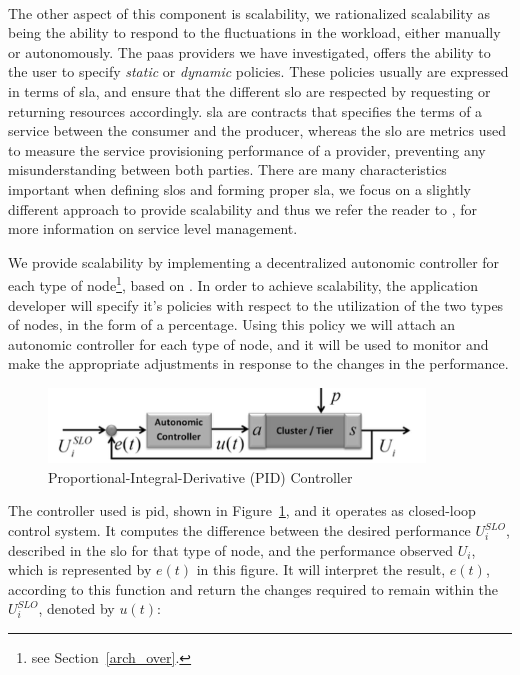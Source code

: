\documentclass[12pt, titlepage]{uo_temp}
\begin{document}

     \\ The other aspect of this component is scalability, we rationalized scalability as
     being the ability to respond to the fluctuations in the workload, either manually or
     autonomously.  The \gls{paas} providers we have investigated, offers the ability to
     the user to specify \emph{static} or \emph{dynamic} policies. These policies usually
     are expressed in terms of \gls{sla}, and ensure that the different \gls{slo} are
     respected by requesting or returning resources accordingly. \gls{sla} are contracts
     that specifies the terms of a service between the consumer and the producer, whereas
     the \gls{slo} are metrics used to measure the service provisioning performance of a
     provider, preventing any misunderstanding between both parties. There are many
     characteristics important when defining \gls{slo}s and forming proper \gls{sla}, we
     focus on a slightly different approach to provide scalability and thus we refer the
     reader to \cite{keller2003wsla} \cite{sturm2000foundations}, for more information on
     service level management.

     We provide scalability by implementing a decentralized autonomic
     controller for each type of node\footnote{see Section~\ref{arch_over}.}, based on
     \cite{gergin2014decentralized}. In order to achieve scalability, the application
     developer will specify it's policies with respect to the utilization of the two types
     of nodes, in the form of a percentage. Using this policy we will attach an autonomic
     controller for each type of node, and it will be used to monitor and make the
     appropriate adjustments in response to the changes in the performance.

     \begin{figure}[h]
       \centering
       \includegraphics[width=100mm]{./images/self_optimization-PID.png}
       \caption{Proportional-Integral-Derivative (PID) Controller
         \cite{gergin2014decentralized}}
       \label{pid_fig}
     \end{figure}

     The controller used is \gls{pid}, shown in Figure~\ref{pid_fig}, and it operates as
     closed-loop control system. It computes the difference between the desired
     performance $U^{SLO}_i$, described in the \gls{slo} for that type of node, and the
     performance observed $U_i$, which is represented by $e(t)$ in this figure. It will
     interpret the result, $e(t)$, according to this function and return the changes
     required to remain within the $U^{SLO}_i$, denoted by $u(t)$:
\end{document}
